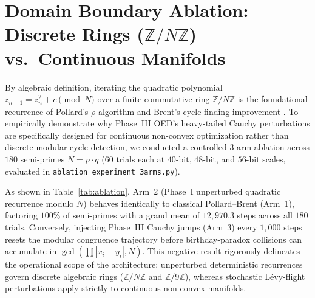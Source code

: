 \documentclass[10pt,a4paper]{article}
\begin{document}
\section{Domain Boundary Ablation: Discrete Rings ($\mathbb{Z}/N\mathbb{Z}$) vs.\ Continuous Manifolds}

By algebraic definition, iterating the quadratic polynomial $z_{n+1} = z_n^2 + c \pmod N$ over a finite commutative ring $\mathbb{Z}/N\mathbb{Z}$ is the foundational recurrence of Pollard's $\rho$ algorithm \cite{pollard1975} and Brent's cycle-finding improvement \cite{brent1980}. To empirically demonstrate why Phase~III OED's heavy-tailed Cauchy perturbations are specifically designed for continuous non-convex optimization rather than discrete modular cycle detection, we conducted a controlled 3-arm ablation across $180$ semi-primes $N = p \cdot q$ ($60$ trials each at $40$-bit, $48$-bit, and $56$-bit scales, evaluated in \texttt{ablation\_experiment\_3arms.py}).

\begin{table}[htbp]
\centering
\caption{Three-Arm Domain Delineation Ablation over 180 Semi-Primes ($N = p \cdot q$, 60 Trials per Bit Scale).}
\label{tab:ablation}
\end{table}

As shown in Table~\ref{tab:ablation}, Arm~2 (Phase~I unperturbed quadratic recurrence modulo $N$) behaves identically to classical Pollard--Brent (Arm~1), factoring $100\%$ of semi-primes with a grand mean of $12,970.3$ steps across all $180$ trials. Conversely, injecting Phase~III Cauchy jumps (Arm~3) every $1,000$ steps resets the modular congruence trajectory before birthday-paradox collisions can accumulate in $\gcd(\prod |x_i - y_i|, N)$. This negative result rigorously delineates the operational scope of the architecture: unperturbed deterministic recurrences govern discrete algebraic rings ($\mathbb{Z}/N\mathbb{Z}$ and $\mathbb{Z}/9\mathbb{Z}$), whereas stochastic L\'{e}vy-flight perturbations apply strictly to continuous non-convex manifolds.
\end{document}
